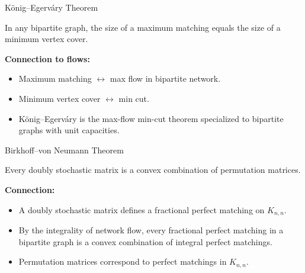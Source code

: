 \documentclass[aspectratio=169]{beamer}
\begin{document}
\begin{frame}{K\"{o}nig--Egerv\'{a}ry Theorem}
  \begin{theorem}
    In any bipartite graph, the size of a maximum matching equals the size of a
    minimum vertex cover.
  \end{theorem}

  \vspace{0.5em}
  \textbf{Connection to flows:}
  \begin{itemize}
    \item Maximum matching $\longleftrightarrow$ max flow in bipartite network.
    \item Minimum vertex cover $\longleftrightarrow$ min cut.
    \item K\"{o}nig--Egerv\'{a}ry is the max-flow min-cut theorem specialized
          to bipartite graphs with unit capacities.
  \end{itemize}
\end{frame}

\begin{frame}{Birkhoff--von Neumann Theorem}
  \begin{theorem}
    Every doubly stochastic matrix is a convex combination of permutation
    matrices.
  \end{theorem}

  \vspace{0.5em}
  \textbf{Connection:}
  \begin{itemize}
    \item A doubly stochastic matrix defines a fractional perfect matching on
          $K_{n,n}$.
    \item By the integrality of network flow, every fractional perfect matching
          in a bipartite graph is a convex combination of integral perfect
          matchings.
    \item Permutation matrices correspond to perfect matchings in $K_{n,n}$.
  \end{itemize}
\end{frame}
\end{document}
